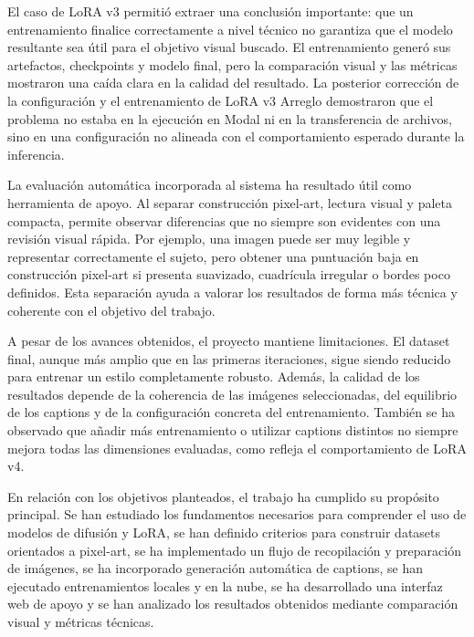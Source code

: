 \documentclass[a4paper,11pt,titlepage]{scrbook}
\begin{document}
\medskip

El caso de LoRA v3 permitió extraer una conclusión importante: que un entrenamiento finalice correctamente a nivel técnico no garantiza que el modelo resultante sea útil para el objetivo visual buscado. El entrenamiento generó sus artefactos, checkpoints y modelo final, pero la comparación visual y las métricas mostraron una caída clara en la calidad del resultado. La posterior corrección de la configuración y el entrenamiento de LoRA v3 Arreglo demostraron que el problema no estaba en la ejecución en Modal ni en la transferencia de archivos, sino en una configuración no alineada con el comportamiento esperado durante la inferencia.

\medskip

La evaluación automática incorporada al sistema ha resultado útil como herramienta de apoyo. Al separar construcción pixel-art, lectura visual y paleta compacta, permite observar diferencias que no siempre son evidentes con una revisión visual rápida. Por ejemplo, una imagen puede ser muy legible y representar correctamente el sujeto, pero obtener una puntuación baja en construcción pixel-art si presenta suavizado, cuadrícula irregular o bordes poco definidos. Esta separación ayuda a valorar los resultados de forma más técnica y coherente con el objetivo del trabajo.

\medskip

A pesar de los avances obtenidos, el proyecto mantiene limitaciones. El dataset final, aunque más amplio que en las primeras iteraciones, sigue siendo reducido para entrenar un estilo completamente robusto. Además, la calidad de los resultados depende de la coherencia de las imágenes seleccionadas, del equilibrio de los captions y de la configuración concreta del entrenamiento. También se ha observado que añadir más entrenamiento o utilizar captions distintos no siempre mejora todas las dimensiones evaluadas, como refleja el comportamiento de LoRA v4.

\medskip

En relación con los objetivos planteados, el trabajo ha cumplido su propósito principal. Se han estudiado los fundamentos necesarios para comprender el uso de modelos de difusión y LoRA, se han definido criterios para construir datasets orientados a pixel-art, se ha implementado un flujo de recopilación y preparación de imágenes, se ha incorporado generación automática de captions, se han ejecutado entrenamientos locales y en la nube, se ha desarrollado una interfaz web de apoyo y se han analizado los resultados obtenidos mediante comparación visual y métricas técnicas.
\end{document}
